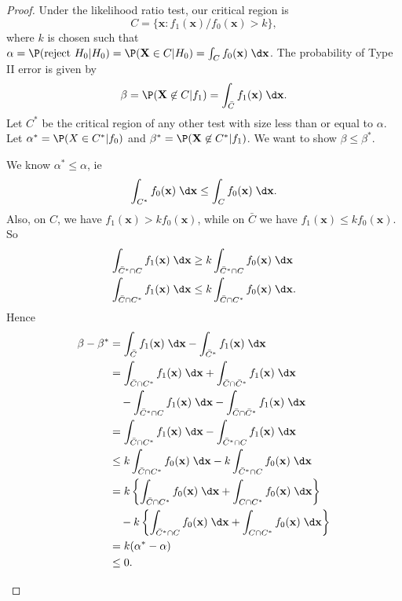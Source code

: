 \documentclass[a4paper]{article}
\begin{document}
\begin{proof}
  Under the likelihood ratio test, our critical region is
  \[
    C = \{\mathbf{x}: f_1(\mathbf{x})/f_0(\mathbf{x}) > k\},
  \]
  where $k$ is chosen such that $\alpha=\P(\text{reject }H_0|H_0) = \P(\mathbf{X}\in C| H_0) = \int_C f_0(\mathbf{x})\;\d \mathbf{x}$. The probability of Type II error is given by
  \[
    \beta = \P(\mathbf{X}\not\in C|f_1) = \int_{\bar C}f_1(\mathbf{x})\;\d \mathbf{x}.
  \]
  Let $C^*$ be the critical region of any other test with size less than or equal to $\alpha$. Let $\alpha^* = \P(X\in C^*|f_0)$ and $\beta^* = \P(\mathbf{X}\not\in C^*|f_1)$. We want to show $\beta \leq \beta^*$.

  We know $\alpha^* \leq \alpha$, ie
  \[
    \int_{C^*}f_0(\mathbf{x})\;\d \mathbf{x}\leq \int_Cf_0(\mathbf{x}) \;\d \mathbf{x}.
  \]
  Also, on $C$, we have $f_1(\mathbf{x}) > kf_0(\mathbf{x})$, while on $\bar C$ we have $f_1(\mathbf{x}) \leq kf_0(\mathbf{x})$. So
  \begin{align*}
    \int_{\bar C^*\cap C} f_1(\mathbf{x}) \;\d \mathbf{x} &\geq k\int_{\bar C^*\cap C}f_0(\mathbf{x}) \;\d \mathbf{x}\\
    \int_{\bar C\cap C^*}f_1(\mathbf{x}) \;\d \mathbf{x} &\leq k\int_{\bar C\cap C^*}f_0 (\mathbf{x})\;\d \mathbf{x}.
  \end{align*}
  Hence
  \begin{align*}
    \beta - \beta^* &= \int_{\bar C}f_1(\mathbf{x}) \;\d \mathbf{x} - \int_{\bar C^*}f_1(\mathbf{x})\;\d \mathbf{x}\\
    &= \int_{\bar C\cap C^*} f_1(\mathbf{x}) \;\d \mathbf{x} + \int_{\bar C\cap \bar C^*}f_1(\mathbf{x})\;\d \mathbf{x} \\
    &\quad - \int_{\bar C^*\cap C} f_1(\mathbf{x}) \;\d \mathbf{x} - \int_{\bar C\cap \bar C^*}f_1(\mathbf{x})\;\d \mathbf{x}\\
    &= \int_{\bar C \cap C^*}f_1(\mathbf{x})\;\d \mathbf{x} - \int_{\bar C^*\cap C}f_1(\mathbf{x})\;\d \mathbf{x}\\
    &\leq k\int_{\bar C \cap C^*}f_0(\mathbf{x})\;\d \mathbf{x} - k\int_{\bar C^*\cap C}f_0(\mathbf{x})\;\d \mathbf{x}\\
    &= k\left\{\int_{\bar C\cap C^*}f_0(\mathbf{x})\;\d \mathbf{x} + \int_{C \cap C^*}f_0(\mathbf{x})\;\d \mathbf{x}\right\} \\
    &\quad- k\left\{\int_{\bar C^*\cap C}f_0(\mathbf{x})\;\d \mathbf{x} + \int_{C\cap C^*}f_0(\mathbf{x})\;\d \mathbf{x}\right\}\\
    &= k(\alpha^* - \alpha)\\
    &\leq 0.
  \end{align*}
  \begin{center}
\end{center}
\end{proof}
\end{document}
